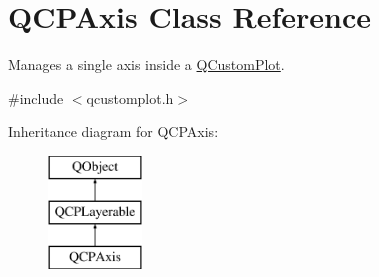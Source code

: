 \hypertarget{class_q_c_p_axis}{}\section{Q\+C\+P\+Axis Class Reference}
\label{class_q_c_p_axis}


Manages a single axis inside a \mbox{\hyperlink{class_q_custom_plot}{Q\+Custom\+Plot}}.  




{\ttfamily \#include $<$qcustomplot.\+h$>$}

Inheritance diagram for Q\+C\+P\+Axis\+:\begin{figure}[H]
\begin{center}
\leavevmode
\includegraphics[height=3.000000cm]{d2/deb/class_q_c_p_axis}
\end{center}
\end{figure}
